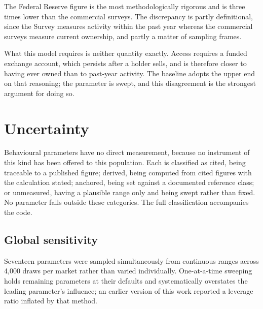 \documentclass[11pt,a4paper]{article}
\begin{document}
The Federal Reserve figure is the most methodologically rigorous and is
three times lower than the commercial surveys. The discrepancy is partly
definitional, since the Survey measures activity within the past year
whereas the commercial surveys measure current ownership, and partly a
matter of sampling frames.

What this model requires is neither quantity exactly. Access requires a
funded exchange account, which persists after a holder sells, and is
therefore closer to having ever owned than to past-year activity. The
baseline adopts the upper end on that reasoning; the parameter is swept, and
this disagreement is the strongest argument for doing so.

\section{Uncertainty}

Behavioural parameters have no direct measurement, because no instrument of
this kind has been offered to this population. Each is classified as cited,
being traceable to a published figure; derived, being computed from cited
figures with the calculation stated; anchored, being set against a
documented reference class; or unmeasured, having a plausible range only and
being swept rather than fixed. No parameter falls outside these categories.
The full classification accompanies the code.

\subsection{Global sensitivity}

Seventeen parameters were sampled simultaneously from continuous ranges
across 4{,}000 draws per market rather than varied individually.
One-at-a-time sweeping holds remaining parameters at their defaults and
systematically overstates the leading parameter's influence; an earlier
version of this work reported a leverage ratio inflated by that method.
\end{document}
